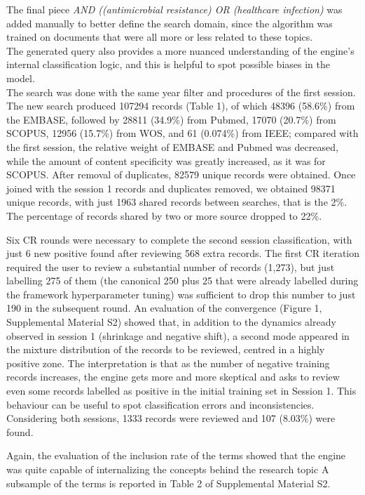 \documentclass{article}
\begin{document}
The final piece \emph{AND ((antimicrobial resistance) OR (healthcare
infection)} was added manually to better define the search domain, since
the algorithm was trained on documents that were all more or less
related to these topics.\\
The generated query also provides a more nuanced understanding of the
engine's internal classification logic, and this is helpful to spot
possible biases in the model.\\

The search was done with the same year filter and procedures of the
first session.\\

The new search produced 107294 records (Table 1), of which 48396
(58.6\%) from the EMBASE, followed by 28811 (34.9\%) from Pubmed, 17070
(20.7\%) from SCOPUS, 12956 (15.7\%) from WOS, and 61 (0.074\%) from
IEEE; compared with the first session, the relative weight of EMBASE and
Pubmed was decreased, while the amount of content specificity was
greatly increased, as it was for SCOPUS. After removal of duplicates,
82579 unique records were obtained. Once joined with the session 1
records and duplicates removed, we obtained 98371 unique records, with
just 1963 shared records between searches, that is the 2\%. The
percentage of records shared by two or more source dropped to 22\%.

Six CR rounds were necessary to complete the second session
classification, with just 6 new positive found after reviewing 568 extra
records. The first CR iteration required the user to review a
substantial number of records (1,273), but just labelling 275 of them
(the canonical 250 plus 25 that were already labelled during the
framework hyperparameter tuning) was sufficient to drop this number to
just 190 in the subsequent round. An evaluation of the convergence
(Figure 1, Supplemental Material S2) showed that, in addition to the
dynamics already observed in session 1 (shrinkage and negative shift), a
second mode appeared in the mixture distribution of the records to be
reviewed, centred in a highly positive zone. The interpretation is that
as the number of negative training records increases, the engine gets
more and more skeptical and asks to review even some records labelled as
positive in the initial training set in Session 1. This behaviour can be
useful to spot classification errors and inconsistencies. Considering
both sessions, 1333 records were reviewed and 107 (8.03\%) were found.

Again, the evaluation of the inclusion rate of the terms showed that the
engine was quite capable of internalizing the concepts behind the
research topic A subsample of the terms is reported in Table 2 of
Supplemental Material S2.
\end{document}
